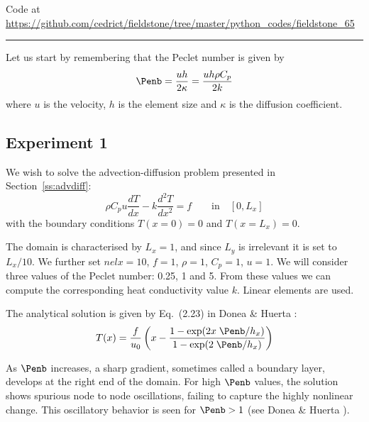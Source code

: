 

\begin{center}
Code at \url{https://github.com/cedrict/fieldstone/tree/master/python_codes/fieldstone_65}
\end{center}

\par\noindent\rule{\textwidth}{0.4pt}

Let us start by remembering that the Peclet number is given by 
\[
\Penb = \frac{uh}{2\kappa} = \frac{uh\rho C_p}{2 k}
\]
where $u$ is the velocity, $h$ is the element size and $\kappa$ is the diffusion coefficient.

\subsection*{Experiment 1}
We wish to solve the advection-diffusion problem presented in 
Section~\ref{ss:advdiff}:
\begin{equation}
\rho C_p u \frac{dT}{dx} - k \frac{d^2T}{dx^2} = f \qquad \text{in} \quad [0,L_x]
\end{equation}
with the boundary conditions $T(x=0)=0$ and $T(x=L_x)=0$.

The domain is characterised by $L_x=1$, and since $L_y$ is irrelevant it is set to $L_x/10$.
We further set $nelx=10$, $f=1$, $\rho=1$, $C_p=1$, $u=1$.
We will consider three values of the Peclet number: 0.25, 1 and 5.
From these values we can compute the corresponding heat conductivity value $k$.
Linear elements are used.

The analytical solution is given by Eq.~(2.23) in Donea \& Huerta \cite{dohu03}:
\[
T(x)= \frac{f}{u_0} \left(  x - \frac{1-\exp(2x \; \Penb /h_x)}{1-\exp(2\; \Penb / h_x)} \right) 
\]

As $\Penb$ increases, a sharp gradient, sometimes called a boundary layer,
develops at the right end of the domain. For high $\Penb$ values, the solution shows 
spurious node to node oscillations, failing to capture the highly nonlinear change. This oscillatory
behavior is seen for $\Penb>1$ (see Donea \& Huerta \cite{dohu03}).

